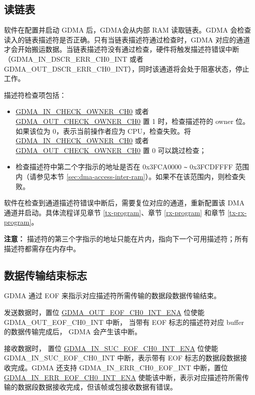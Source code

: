\documentclass[main\_\_CN.tex]{subfiles}
\begin{document}
\subsection{读链表}

软件在配置并启动 GDMA 后，GDMA会从内部 RAM 读取链表。GDMA 会检查读入的链表描述符是否正确。只有当链表描述符通过检查时，GDMA 对应的通道 才会开始搬运数据。当链表描述符没有通过检查，硬件将触发描述符错误中断（GDMA\_IN\_DSCR\_ERR\_CH0\_INT 或者 GDMA\_OUT\_DSCR\_ERR\_CH0\_INT），同时该通道将会处于阻塞状态，停止工作。

描述符检查项包括：
\begin{itemize}
    \item \hyperref[fielddesc:GDMAINCHECKOWNERCH0]{GDMA\_IN\_CHECK\_OWNER\_CH0} 或者 \hyperref[fielddesc:GDMAOUTCHECKOWNERCH0]{GDMA\_OUT\_CHECK\_OWNER\_CH0} 置 1 时，检查描述符的 owner 位。如果该位为 0，表示当前操作者应为 CPU，检查失败。将\hyperref[fielddesc:GDMAINCHECKOWNERCH0]{GDMA\_IN\_CHECK\_OWNER\_CH0} 或者 \hyperref[fielddesc:GDMAOUTCHECKOWNERCH0]{GDMA\_OUT\_CHECK\_OWNER\_CH0} 置 0 可以跳过检查；\\

    \item 检查描述符中第二个字指示的地址是否在 0x3FCA0000 \verb+~+ 0x3FCDFFFF 范围内（请参见本节 \ref{sec:dma-access-inter-ram}）。如果不在该范围内，则检查失败。\\
\end{itemize}

软件在检查到通道描述符错误中断后，需要复位对应的通道，重新配置该 DMA 通道并启动。具体流程详见章节 \ref{tx-program}、章节 \ref{rx-program} 和章节 \ref{tx-rx-program}。

{\bfseries 注意：} 描述符的第三个字指示的地址只能在片内，指向下一个可用描述符；所有描述符都需存在内存中。


\subsection{数据传输结束标志}

GDMA 通过 EOF 来指示对应描述符所需传输的数据段数据传输结束。

发送数据时，置位 \hyperref[fielddesc:GDMAOUTTOTALEOFCH0INTENA]{GDMA\_OUT\_EOF\_CH0\_INT\_ENA} 位使能\\ GDMA\_OUT\_EOF\_CH0\_INT 中断， 当带有 EOF 标志的描述符对应 buffer 的数据传输完成后， GDMA 会产生该中断。

接收数据时， 置位 \hyperref[fielddesc:GDMAINSUCEOFCH0INTENA]{GDMA\_IN\_SUC\_EOF\_CH0\_INT\_ENA} 位使能 GDMA\_IN\_SUC\_EOF\_CH0\_INT 中断，表示带有 EOF 标志的数据段数据接收完成。GDMA 还支持 GDMA\_IN\_ERR\_CH0\_EOF\_INT 中断，置位 \hyperref[fielddesc:GDMAINERREOFCH0INTENA]{GDMA\_IN\_ERR\_EOF\_CH0\_INT\_ENA} 使能该中断，表示对应描述符所需传输的数据段数据接收完成，但该帧或包接收数据有错误。
\end{document}
